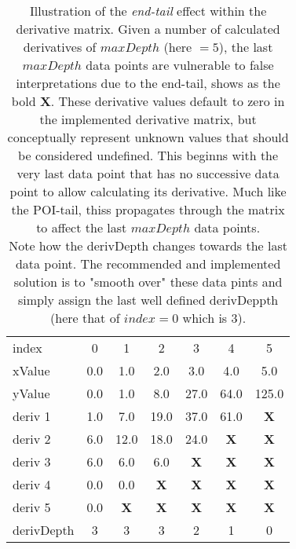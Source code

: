 \documentclass[main.tex]{subfiles}
\begin{document}
  
  \begin{table}[h]
    \centering
    \caption{Illustration of the \textit{end-tail} effect within the derivative matrix. Given a number of calculated derivatives of $maxDepth$ (here $=5$), the last $maxDepth$ data points are vulnerable to false interpretations due to the end-tail, shows as the bold \textbf{X}. These derivative values default to zero in the implemented derivative matrix, but conceptually represent unknown values that should be considered undefined. This beginns with the very last data point that has no successive data point to allow calculating its derivative. Much like the POI-tail, thiss propagates through the matrix to affect the last $maxDepth$ data points.\\
    Note how the derivDepth changes towards the last data point. The recommended and implemented solution is to "smooth over" these data pints and simply assign the last well defined derivDeppth (here that of $index=0$ which is $3$).}
    \begin{tabularx}{0.65\linewidth}{ X | c c c c c c }
      index & 0 & 1 & 2 & 3 & 4 & 5 \\
      xValue & 0.0 & 1.0 & 2.0 & 3.0 & 4.0 & 5.0 \\
      \hline \hline
      yValue & 0.0 & 1.0 & 8.0 & 27.0 & 64.0 & 125.0 \\
      \hline
      deriv 1 & 1.0 & 7.0 & 19.0 & 37.0 & 61.0 & \textbf{X} \\
      deriv 2 & 6.0 & 12.0 & 18.0 & 24.0 & \textbf{X} & \textbf{X} \\
      deriv 3 & 6.0 & 6.0 & 6.0 & \textbf{X} & \textbf{X} & \textbf{X} \\
      deriv 4 & 0.0 & 0.0 & \textbf{X} & \textbf{X} & \textbf{X} & \textbf{X} \\
      deriv 5 & 0.0 & \textbf{X} & \textbf{X} & \textbf{X} & \textbf{X} & \textbf{X} \\
      \hline
      derivDepth & 3  & 3 & 3 & 2 & 1 & 0 \\
    \end{tabularx}
  \label{tbl:mtrx:endError}
  \end{table}
  
\end{document}
